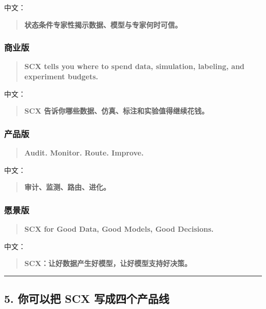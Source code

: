 \documentclass[
  12pt,
]{ctexart}
\begin{document}
中文：

\begin{quote}
\textbf{状态条件专家性揭示数据、模型与专家何时可信。}
\end{quote}

\subsubsection{商业版}\label{ux5546ux4e1aux7248}

\begin{quote}
\textbf{SCX tells you where to spend data, simulation, labeling, and
experiment budgets.}
\end{quote}

中文：

\begin{quote}
\textbf{SCX 告诉你哪些数据、仿真、标注和实验值得继续花钱。}
\end{quote}

\subsubsection{产品版}\label{ux4ea7ux54c1ux7248}

\begin{quote}
\textbf{Audit. Monitor. Route. Improve.}
\end{quote}

中文：

\begin{quote}
\textbf{审计、监测、路由、进化。}
\end{quote}

\subsubsection{愿景版}\label{ux613fux666fux7248}

\begin{quote}
\textbf{SCX for Good Data, Good Models, Good Decisions.}
\end{quote}

中文：

\begin{quote}
\textbf{SCX：让好数据产生好模型，让好模型支持好决策。}
\end{quote}

\begin{center}\rule{0.5\linewidth}{0.5pt}\end{center}

\subsection{5. 你可以把 SCX
写成四个产品线}\label{ux4f60ux53efux4ee5ux628a-scx-ux5199ux6210ux56dbux4e2aux4ea7ux54c1ux7ebf}
\end{document}
